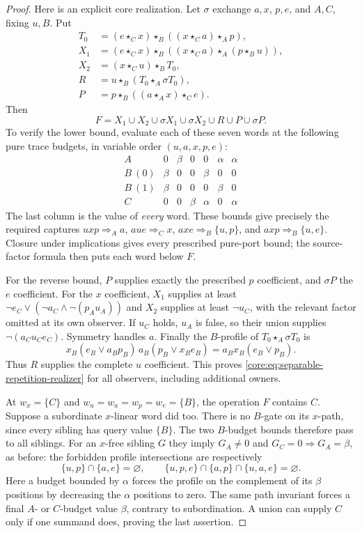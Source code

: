 \begin{proof}
Here is an explicit core realization. Let $\sigma$ exchange
$a,x$, $p,e$, and $A,C$, fixing $u,B$. Put
\begin{align*}
 T_0&=(e\star_Cx)\star_B((x\star_Ca)\star_Ap),\\
 X_1&=(e\star_Cx)\star_B((x\star_Ca)\star_A(p\star_Bu)),\\
 X_2&=(x\star_Cu)\star_BT_0,\\
 R&=u\star_B(T_0\star_A\sigma T_0),\\
 P&=p\star_B((a\star_Ax)\star_Ce).
\end{align*}
Then
\begin{equation}\label{core:eq:separable-repetition-realizer}
 F=X_1\cup X_2\cup\sigma X_1\cup\sigma X_2\cup R\cup P\cup\sigma P.
\end{equation}
To verify the lower bound, evaluate each of these seven words at
the following pure trace budgets, in variable order $(u,a,x,p,e)$:
\[
\begin{array}{c|ccccc|c}
 A&0&\beta&0&0&\alpha&\alpha\\
 B\ (0)&\beta&0&0&\beta&0&0\\
 B\ (1)&\beta&0&0&0&\beta&0\\
 C&0&0&\beta&\alpha&0&\alpha
\end{array}
\]
The last column is the value of \emph{every} word. These bounds
give precisely the required captures
$uxp\Rightarrow_Aa$, $aue\Rightarrow_Cx$,
$axe\Rightarrow_B\{u,p\}$, and $axp\Rightarrow_B\{u,e\}$.
Closure under implications gives every prescribed pure-port bound;
the source-factor formula then puts each word below $F$.

For the reverse bound, $P$ supplies exactly the prescribed $p$
coefficient, and $\sigma P$ the $e$ coefficient. For the $x$
coefficient, $X_1$ supplies at least
$\neg e_C\vee(\neg a_C\wedge\neg(p_Au_A))$ and $X_2$ supplies
at least $\neg u_C$, with the relevant factor omitted at its own
observer. If $u_C$ holds, $u_A$ is false, so their union supplies
$\neg(a_Cu_Ce_C)$. Symmetry handles $a$.
Finally the $B$-profile of $T_0\star_A\sigma T_0$ is
\[
 x_B(e_B\vee a_Bp_B)\,a_B(p_B\vee x_Be_B)
   =a_Bx_B(e_B\vee p_B).
\]
Thus $R$ supplies the complete $u$ coefficient. This proves
\eqref{core:eq:separable-repetition-realizer} for all observers,
including additional owners.

At $w_x=\{C\}$ and $w_u=w_a=w_p=w_e=\{B\}$, the operation $F$
contains $C$. Suppose a subordinate $x$-linear word did too.
There is no $B$-gate on its $x$-path, since every sibling has query
value $\{B\}$. The two $B$-budget bounds therefore pass to all
siblings. For an $x$-free sibling $G$ they imply
$G_A\ne0$ and $G_C=0\Rightarrow G_A=\beta$, as before:
the forbidden profile intersections are respectively
\[
 \{u,p\}\cap\{a,e\}=\varnothing,\qquad
 \{u,p,e\}\cap\{a,p\}\cap\{u,a,e\}=\varnothing.
\]
Here a budget bounded by $\alpha$ forces the profile on the
complement of its $\beta$ positions by decreasing the $\alpha$
positions to zero. The same path invariant forces a final $A$- or
$C$-budget value $\beta$, contrary to subordination. A union can
supply $C$ only if one summand does, proving the last assertion.
\end{proof}
